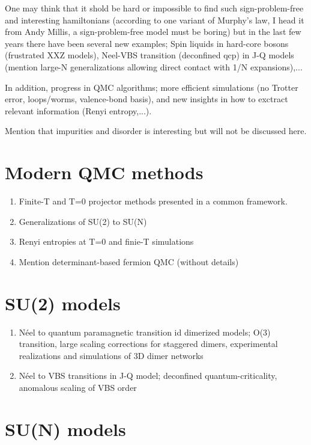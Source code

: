 \documentclass[aps,prb,groupedaddress, twocolumn]{revtex4}
\begin{document}
One may think that it shold be hard or impossible to find such sign-problem-free and interesting hamiltonians
(according to one variant of Murphy's law, I head it from Andy Millis, a sign-problem-free model must be
boring) but in the last few years there have been several new examples; Spin liquids in hard-core bosons
(frustrated XXZ models), Neel-VBS transition (deconfined qcp) in J-Q models (mention large-N
generalizations allowing direct contact with 1/N expansions),...

In addition, progress in QMC algorithms; more efficient simulations (no Trotter error, loops/worms,
valence-bond basis), and new insights in how to exctract relevant information (Renyi entropy,...).

Mention that impurities and disorder is interesting but will not be discussed here.

\section{Modern QMC methods}

\begin{enumerate}
\item Finite-T and T=0 projector methods presented in a common framework.
\item Generalizations of SU(2) to SU(N) 
\item Renyi entropies at T=0 and finie-T simulations
\item Mention determinant-based fermion QMC (without details)
\end{enumerate}

\section{SU(2) models}

\begin{enumerate}
\item N\'eel to quantum paramagnetic transition id dimerized models; O(3) transition, large scaling
corrections for staggered dimers, experimental realizations and simulations of 3D dimer networks
\item N\'eel to VBS transitions in J-Q model; deconfined quantum-criticality, anomalous scaling of VBS order
\end{enumerate}

\section{SU(N) models}
\end{document}
